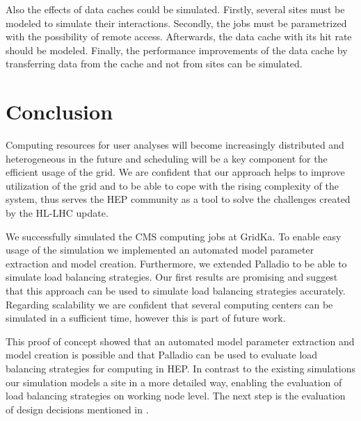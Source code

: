 \documentclass{webofc}
\begin{document}
Also the effects of data caches could be simulated. Firstly, several sites must be modeled to simulate their interactions. Secondly, the jobs must be parametrized with the possibility of remote access. Afterwards, the data cache with its hit rate should be modeled. Finally, the performance improvements of the data cache by transferring data from the cache and not from sites can be simulated.
\section{Conclusion}
\label{conlusion}

Computing resources for user analyses will become increasingly distributed and heterogeneous in the future and 
scheduling will be a key component for the efficient usage of the grid. We are confident that our approach helps to improve utilization of the grid and to be able to cope with the rising complexity of the system, thus serves the HEP community as a tool to solve the challenges created by the HL-LHC update.

We successfully simulated the CMS computing jobs at GridKa. To enable easy usage of the simulation we implemented an automated model parameter extraction and model creation. Furthermore, we extended Palladio to be able to simulate load balancing strategies. Our first results are promising and suggest that this approach can be used to simulate load balancing strategies accurately. Regarding scalability we are confident that several computing centers can be simulated in a sufficient time, however this is part of future work.

This proof of concept showed that an automated model parameter extraction and model creation is possible and that Palladio can be used to evaluate load balancing strategies for computing in HEP. In contrast to the existing simulations our simulation models a site in a more detailed way, enabling the evaluation of load balancing strategies on working node level. The next step is the evaluation of design decisions mentioned in .





\end{document}
